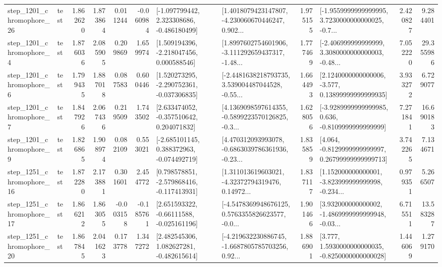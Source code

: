 \begin{tabular}{llrrrrllrlrr}
 step\_1201\_chromophore\_26 &      test &      1.862620 &    1.873864 &      0.011244 & -0.060984 &   [-1.097799442, 2.323308686, -0.486180499] &  [1.4018079423147807, -4.230060670446247, 0.902... &       1.975155 &  [-1.9559999999999995, 3.7230000000000025, -0.7... &            2.420827 &          9.284401 \\
  step\_1201\_chromophore\_4 &      test &      1.876036 &    2.085905 &      0.209869 &  1.659974 &    [1.509194396, -2.218047456, 0.000588546] &  [1.8997602754601906, -3.111292659437317, -1.48... &       1.777469 &  [-2.406999999999999, 3.3080000000000003, -0.48... &            7.052220 &         29.355986 \\
  step\_1201\_chromophore\_6 &      test &      1.799435 &    1.887018 &      0.087583 &  0.600446 &   [1.520273295, -2.290752361, -0.037306835] &  [-2.4481638218793735, 3.539004487044528, -0.55... &       1.664493 &  [2.1240000000000006, -3.577, 0.13899999999999935] &            3.933272 &          6.729077 \\
  step\_1201\_chromophore\_7 &      test &      1.847926 &    2.067436 &      0.219509 &  1.743502 &    [2.633474052, -0.357510642, 0.204071832] &  [4.1369098597614355, -0.5899223570126825, -0.3... &       1.628056 &  [-3.9289999999999985, 0.636, -0.8109999999999999] &            7.271841 &         16.690183 \\
  step\_1201\_chromophore\_9 &      test &      1.826865 &    1.908974 &      0.082109 &  0.553021 &   [-2.685101145, 0.388372963, -0.074492719] &  [4.470312093993078, -0.6863039786361936, -0.23... &       1.835859 &  [4.064, -0.8129999999999997, 0.26799999999999713] &            3.742265 &          7.134671 \\
 step\_1251\_chromophore\_16 &      test &      1.872280 &    2.173881 &      0.301601 &  2.454772 &   [0.798578851, -2.579868416, -0.117413931] &  [1.311013619603021, -4.32372794319476, 0.14972... &       1.837117 &  [1.152000000000001, -3.823999999999998, -0.234... &            0.979351 &          5.266507 \\
 step\_1251\_chromophore\_17 &      test &      1.866212 &    1.863055 &     -0.003158 & -0.185761 &    [2.651593322, -0.66111588, -0.025161196] &  [-4.5478369948676125, 0.5763355826623577, -0.0... &       1.901466 &  [3.932000000000002, -1.4869999999999948, -0.03... &            6.715511 &         13.583287 \\
 step\_1251\_chromophore\_20 &      test &      1.867845 &    2.041623 &      0.173778 &  1.347272 &    [2.482545306, 1.082627281, -0.482615614] &  [-4.219632230886745, -1.6687805785703256, 0.92... &       1.886901 &   [3.777, 1.5930000000000035, -0.8250000000000028] &            1.446069 &          1.279170 \\

\end{tabular}
